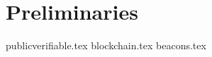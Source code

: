 \section{Preliminaries}\label{sec:preliminaries}

{publicverifiable.tex}
{blockchain.tex}
{beacons.tex}